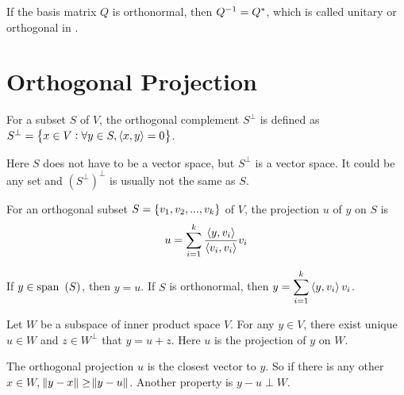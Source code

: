 If the basis matrix $Q$ is orthonormal, then ${Q}^{-1} = Q^*$, which is called unitary or orthogonal in .



\section{Orthogonal Projection}



\begin{definition}
    For a subset $S$ of $V$, the orthogonal complement $S^\perp$ is defined as $S^\perp=\set{x \in V: \forall y \in S, \left\langle \displaystyle x, y \right\rangle = 0}$.
\end{definition}

Here $S$ does not have to be a vector space, but $S^\perp$ is a vector space. It could be any set and $(S^\perp)^\perp$ is usually not the same as $S$. 



For an orthogonal subset $S=\set{v_1, v_2, ..., v_k}$ of $V$, the projection $u$ of $y$ on $S$ is 
\begin{equation}
    u = \sum_{i=1}^k \frac{\left\langle \displaystyle y, v_i \right\rangle}{\left\langle \displaystyle v_i, v_i \right\rangle} v_i
\end{equation}

\begin{theorem}
If $y \in \displaystyle \mathrm{span}~\left( S \right)$, then $\displaystyle y = u$. If $S$ is orthonormal, then $\displaystyle y = \sum_{i=1}^k \left\langle \displaystyle y, v_i \right\rangle v_i$.     
\end{theorem}





\begin{theorem}
Let $W$ be a subspace of inner product space $V$. For any $y \in V$, there exist unique $u \in W$ and $z \in W^\perp$ that $y = u + z$. Here $u$ is the projection of $y$ on $W$.
    
\end{theorem}

The orthogonal projection $u$ is the closest vector to $y$. So if there is any other $x \in W$, $\norm{y - x} \geq \norm{y - u}$. Another property is $y - u \perp W$.




